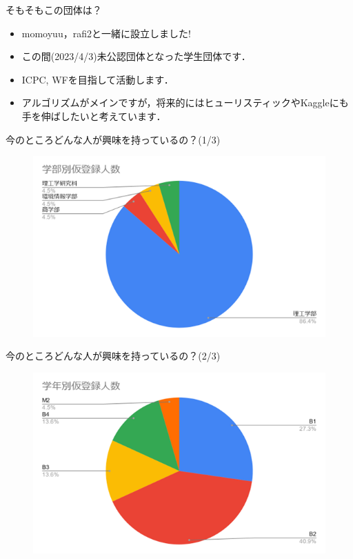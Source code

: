 \documentclass[12pt, unicode]{beamer}
\begin{document}
  \begin{frame}{そもそもこの団体は？}
    \begin{itemize}
      \item \textcolor[HTML]{c0c000}{momoyuu}，\textcolor[HTML]{008000}{rafi2}と一緒に設立しました! \pause
      \item この間(2023/4/3)未公認団体となった学生団体です．\pause
      \item ICPC, WFを目指して活動します． 
      \item アルゴリズムがメインですが，将来的にはヒューリスティックやKaggleにも手を伸ばしたいと考えています．
    \end{itemize}
  \end{frame}
  \begin{frame}{今のところどんな人が興味を持っているの？(1/3)}
    \begin{figure}
      \centering
      \includegraphics[scale = 0.5]{faclty.png}
    \end{figure}
  \end{frame}
  \begin{frame}{今のところどんな人が興味を持っているの？(2/3)}
    \begin{figure}
      \centering
      \includegraphics[scale = 0.5]{year.png}
    \end{figure}
  \end{frame}
\end{document}
